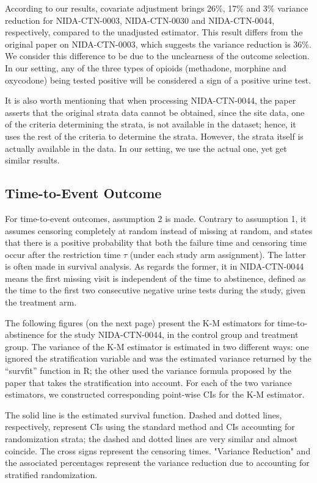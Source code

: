 \documentclass{article}
\begin{document}
According to our results, covariate adjustment brings 26\%, 17\% and 3\% variance reduction for NIDA-CTN-0003, NIDA-CTN-0030 and NIDA-CTN-0044, respectively, compared to the unadjusted estimator. This result differs from the original paper on NIDA-CTN-0003, which suggests the variance reduction is 36\%. We consider this difference to be due to the unclearness of the outcome selection. In our setting, any of the three types of opioids (methadone, morphine and oxycodone) being tested positive will be considered a sign of a positive urine test.

It is also worth mentioning that when processing NIDA-CTN-0044, the paper asserts that the original strata data cannot be obtained, since the site data, one of the criteria determining the strata, is not available in the dataset; hence, it uses the rest of the criteria to determine the strata. However, the strata itself is actually available in the data. In our setting, we use the actual one, yet get similar results.

\subsection{Time-to-Event Outcome}

For time-to-event outcomes, assumption 2 is made. Contrary to assumption 1, it assumes censoring completely at random instead of missing at random, and states that there is a positive probability that both the failure time and censoring time occur after the restriction time $\tau$ (under each study arm assignment). The latter is often made in survival analysis. As regards the former, it in NIDA-CTN-0044 means the first missing visit is independent of the time to abstinence, defined as the time to the first two consecutive negative urine tests during the study, given the treatment arm. 

The following figures (on the next page) present the K-M estimators for time-to-abstinence for the study NIDA-CTN-0044, in the control group and treatment group. The variance of the K-M estimator is estimated in two different ways: one ignored the stratification variable and was the estimated variance returned by the “survfit” function in R; the other used the variance formula proposed by the paper that takes the stratification into account. For each of the two variance estimators, we constructed corresponding point-wise CIs for the K-M estimator. 

The solid line is the estimated survival function. Dashed and dotted lines, respectively, represent CIs using the standard method and CIs accounting for randomization strata; the dashed and dotted lines are very similar and almost coincide. The cross signs represent the censoring times. "Variance Reduction" and the associated percentages represent the variance reduction due to accounting for stratified randomization.
\end{document}

